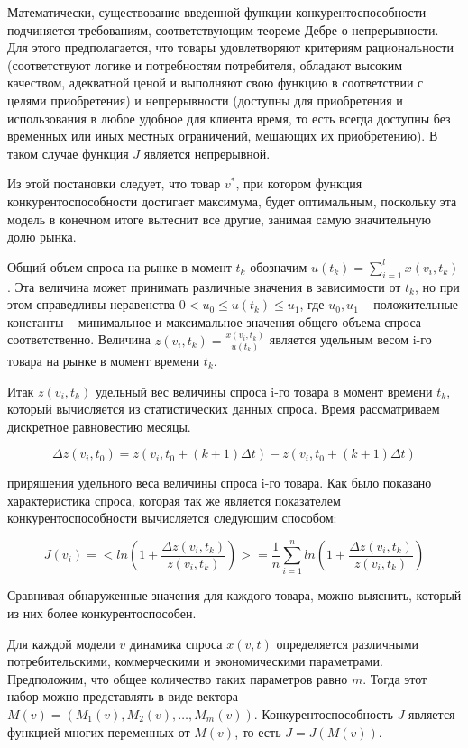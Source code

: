 \documentclass[14pt, a4paper]{extarticle}
\begin{document}
  Математически, существование введенной функции конкурентоспособности подчиняется требованиям, соответствующим теореме Дебре о непрерывности. Для этого предполагается, что товары удовлетворяют критериям рациональности (соответствуют логике и потребностям потребителя, обладают высоким качеством, адекватной ценой и выполняют свою функцию в соответствии с целями приобретения) и непрерывности (доступны для приобретения и использования в любое удобное для клиента время, то есть всегда доступны без временных или иных местных ограничений, мешающих их приобретению). В таком случае функция \( J \) является непрерывной.

  Из этой постановки следует, что товар \( v^* \), при котором функция конкурентоспособности достигает максимума, будет оптимальным, поскольку эта модель в конечном итоге вытеснит все другие, занимая самую значительную долю рынка.
  
  Общий объем спроса на рынке в момент \( t_k \) обозначим \( u(t_k) = \sum_{i=1}^l x(v_i, t_k) \). Эта величина может принимать различные значения в зависимости от \( t_k \), но при этом справедливы неравенства \( 0 < u_0 \leq u(t_k) \leq u_1 \), где \( u_0, u_1 \) – положительные константы – минимальное и максимальное значения общего объема спроса соответственно. Величина \( z(v_i, t_k) = \frac{x(v_i, t_k)}{u(t_k)} \) является удельным весом i-го товара на рынке в момент времени \( t_k \).
  
  Итак \( z(v_i, t_k) \) удельный вес величины спроса i-го товара в момент времени \( t_k \), который вычисляется из статистических данных спроса. Время рассматриваем дискретное равновестию месяцы.
  
  \[
  \Delta z(v_i, t_0) = z(v_i, t_0 + (k+1)\Delta t) - z(v_i, t_0 + (k+1)\Delta t)
  \]
  
  \noindent приряшения удельного веса величины спроса i-го товара. Как было показано характеристика спроса, которая так же является показателем конкурентоспособности вычисляется следующим способом:
  
  \[
  J(v_i) =< ln(1+\frac{\Delta z(v_i, t_k)}{z(v_i, t_k)}) >= \frac{1}{n} \sum_{i=1}^n ln(1+\frac{\Delta z(v_i, t_k)}{z(v_i, t_k)})
  \]
  
  Сравнивая обнаруженные значения для каждого товара, можно выяснить, который из них более конкурентоспособен.
  
  Для каждой модели \( v \) динамика спроса \( x(v, t) \) определяется различными потребительскими, коммерческими и экономическими параметрами. Предположим, что общее количество таких параметров равно \( m \). Тогда этот набор можно представлять в виде вектора \( M(v) = (M_1(v), M_2(v), \ldots, M_m(v)) \). Конкурентоспособность \( J \) является функцией многих переменных от \( M(v) \), то есть \( J = J(M(v)) \).
  
\end{document}
